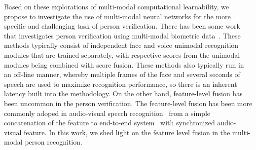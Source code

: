 \documentclass{article}
\newcommand{\ohcm}[1]{\textcolor{red}{Oh$>$ #1 --}}
\begin{document}
Based on these explorations of multi-modal computational learnability, 
we propose to investigate the use of multi-modal neural networks for the more specific and challenging task of person verification. 
There has been some work that investigates person verification using multi-modal biometric data~\cite{Choudhury1999,Luque2006,Thomas2006,hazen07,Sargin2009,Sell2018multimodal}.
These methods typically consist of independent face and voice unimodal recognition modules that are trained separately, with respective scores from the unimodal modules being combined with score fusion.
These methods also typically run in an off-line manner, whereby multiple frames of the face and several seconds of speech are used to maximize recognition performance, so there is an inherent latency built into the methodology.
On the other hand, feature-level fusion has been uncommon in the person verification.
The feature-level fusion has been more commonly adoped in audio-visual speech recognition~\cite{Neti2000, Kratt2004} from a simple concatenation of the feature to end-to-end system~\cite{Sanabria2016, Petridis2018} with synchronized audio-visual feature.
In this work, we shed light on the feature level fusion in the multi-modal person recognition.
\end{document}
